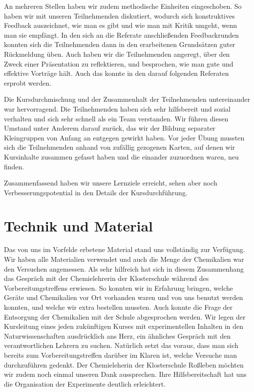\documentclass{scrartcl}
\begin{document}
An mehreren Stellen haben wir zudem methodische Einheiten eingeschoben. So haben wir mit unseren Teilnehmenden diskutiert, wodurch sich konstruktives Feedback auszeichnet, wie man es gibt und wie man mit Kritik umgeht, wenn man sie empf{\"a}ngt. In den sich an die Referate anschlie{\ss}enden Feedbackrunden konnten sich die Teilnehmenden dann in den erarbeitenen Grunds{\"a}tzen guter R{\"u}ckmeldung {\"u}ben. Auch haben wir die Teilnehmenden angeregt, {\"u}ber den Zweck einer Pr{\"a}sentation zu reflektieren, und besprochen, wie man gute und effektive Vortr{\"a}ge h{\"a}lt. Auch das konnte in den darauf folgenden Referaten erprobt werden.\medskip

Die Kursdurchmischung und der Zusammenhalt der Teilnehmenden untereinander war
hervorragend. Die Teilnehmenden haben sich sehr hilfsbereit und sozial
verhalten und sich sehr schnell als ein Team verstanden. Wir f{\"u}hren diesen
Umstand unter Anderem darauf zur{\"u}ck, das wir der Bildung separater
Kleingruppen von Anfang an entgegen gewirkt haben. Vor jeder {\"U}bung mussten
sich die Teilnehmenden anhand von zuf{\"a}llig gezogenen Karten, auf denen
wir Kursinhalte zusammen gefasst haben und die einander zuzuordnen waren,
neu finden.\medskip

Zusammenfassend haben wir unsere Lernziele erreicht, sehen aber noch Verbesserungspotential in den Details der Kursdurchf{\"u}hrung.\bigskip

\section*{Technik und Material}

Das von uns im Vorfelde erbetene Material stand uns vollst{\"a}ndig zur Verf{\"u}gung. Wir haben alle Materialien verwendet und auch die Menge der Chemikalien war den Versuchen angemessen. Als sehr hilfreich hat sich in diesem Zusammenhang das Gespr{\"a}ch mit der Chemielehrerin der Klosterschule w{\"a}hrend des Vorbereitungstreffens erwiesen. So konnten wir in Erfahrung bringen, welche Ger{\"a}te und Chemikalien vor Ort vorhanden waren und von uns benutzt werden konnten, und welche wir extra bestellen mussten. Auch konnte die Frage der Entsorgung der Chemikalien mit der Schule abgesprochen werden. Wir legen der Kursleitung eines jeden zuk{\"u}nftigen Kurses mit experimentellen Inhalten in den Naturwissenschaften ausdr{\"u}cklich ans Herz, ein {\"a}hnliches Gespr{\"a}ch mit den verantwortlichen Lehrern zu suchen. Nat{\"u}rlich setzt das voraus, dass man sich bereits zum Vorbereitungstreffen dar{\"u}ber im Klaren ist, welche Versuche man durchzuf{\"u}hren gedenkt. Der Chemieleherin der Klosterschule Ro{\ss}leben m{\"o}chten wir zudem noch einmal unseren Dank aussprechen. Ihre Hilfsbereitschaft hat uns die Organisation der Experimente deutlich erleichtert.\medskip
\end{document}
